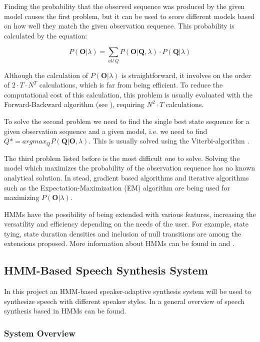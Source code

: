 Finding the probability that the observed sequence was produced by the given model causes the first problem, but it can be used to score different models based on how well they match the given observation sequence. This probability is calculated by the equation:

\begin{equation}
P(\mathbf{O}|\lambda) = \sum_{all \ Q} P(\mathbf{O}|\mathbf{Q},\lambda) \cdot P(\mathbf{Q}|\lambda)
\end{equation}

Although the calculation of $P(\mathbf{O}|\lambda)$ is straightforward, it involves on the order of $2 \cdot T \cdot N^{T}$ calculations, which is far from being efficient.
%
To reduce the computational cost of this calculation, this problem is usually evaluated with the Forward-Backward algorithm (see \cite{rabiner89}), requiring $N^{2} \cdot T $ calculations.

To solve the second problem we need to find the single best state sequence for a given observation sequence and a given model, i.e. we need to find $Q* = arg max_{Q} P(\mathbf{Q}|\mathbf{O},\lambda)$. 
%
This is usually solved using the Viterbi-algorithm \cite{viterbi67}. 

The third problem listed before is the most difficult one to solve.
%
Solving the model which maximizes the probability of the observation sequence has no known analytical solution. 
%
In stead, gradient based algorithms and iterative algorithms such as the Expectation-Maximization (EM) algorithm \cite{dempster77} are being used for maximizing $P(\mathbf{O}|\lambda)$.

HMMs have the possibility of being extended with various features, increasing the versatility and efficiency depending on the needs of the user. 
%
For example, state tying, state duration densities and inclusion of null transitions are among the extensions proposed.
%
More information about HMMs can be found in  \cite{rabiner89} and \cite{rabiner93}.

\subsection{HMM-Based Speech Synthesis System}
\label{hmm_synthesis_based_system}
In this project an HMM-based speaker-adaptive synthesis system will be used to synthesize speech with different speaker styles.
%
In \cite{tokuda13} a general overview of speech synthesis based in HMMs can be found.

\subsubsection{System Overview}
\label{hmm_synthesis_based_system_overview}
